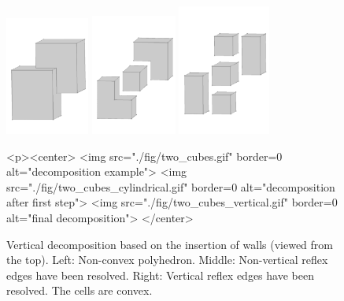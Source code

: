 \begin{figure}[h]
  \begin{ccTexOnly}
    \begin{center}
      \includegraphics[width=0.245\textwidth]{Convex_decomposition_3/fig/two_cubes} \hspace{4mm}
      \includegraphics[width=0.25\textwidth]{Convex_decomposition_3/fig/two_cubes_cylindrical} \hspace{1mm}
      \includegraphics[width=0.27\textwidth]{Convex_decomposition_3/fig/two_cubes_vertical}
    \end{center}
  \end{ccTexOnly}
  \begin{ccHtmlOnly}
    <p><center>
    <img src="./fig/two_cubes.gif" border=0 alt="decomposition
    example">
    <img src="./fig/two_cubes_cylindrical.gif" border=0 alt="decomposition
    after first step">
    <img src="./fig/two_cubes_vertical.gif" border=0 alt="final decomposition">
    </center>
  \end{ccHtmlOnly}
  \caption{Vertical decomposition based on the insertion of walls 
	   (viewed from the top). Left: Non-convex polyhedron. Middle:
	   Non-vertical reflex edges have been resolved. Right: Vertical
           reflex edges have been resolved. The cells are convex.}
  \label{fig:verticalDecomposition}
\end{figure}

